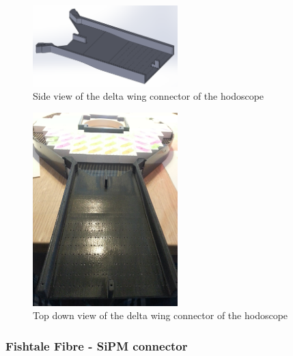 \begin{figure}[!ht]
	\centering
	\includegraphics[width=0.5\textwidth]{ImgChap1/deltawingside}
	\caption{Side view of the delta wing connector of the hodoscope}
	\label{DeltaWingSide}
\end{figure}

\begin{figure}[!ht]
	\centering
	\includegraphics[width=0.5\textwidth]{ImgChap1/deltawing}
	\caption{Top down view of the delta wing connector of the hodoscope}
	\label{DeltaWingTop}
\end{figure}



\subsubsection*{Fishtale Fibre - SiPM connector}

